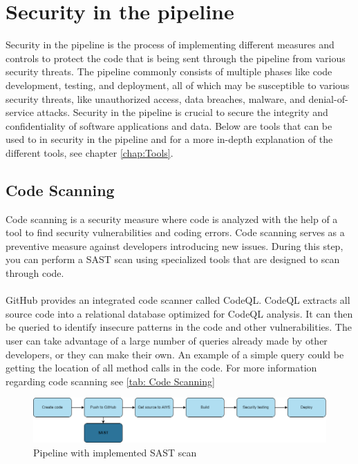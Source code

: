 \section{Security in the pipeline}
Security in the pipeline is the process of implementing different measures and controls to protect the code that is being sent through the pipeline from various security threats. The pipeline commonly consists of multiple phases like code development, testing, and deployment, all of which may be susceptible to various security threats, like unauthorized access, data breaches, malware, and denial-of-service attacks. Security in the pipeline is crucial to secure the integrity and confidentiality of software applications and data.
Below are tools that can be used to in security in the pipeline and for a more in-depth explanation of the different tools, see chapter \ref{chap:Tools}. 

\subsection{Code Scanning}
Code scanning is a security measure where code is analyzed with the help of a tool to find security vulnerabilities and coding errors. Code scanning serves as a preventive measure against developers introducing new issues. During this step, you can perform a SAST scan using specialized tools that are designed to scan through code. 
\\
\\
GitHub provides an integrated code scanner called CodeQL. CodeQL extracts all source code into a relational database optimized for CodeQL analysis.  It can then be queried to identify insecure patterns in the code and other vulnerabilities. The user can take advantage of a large number of queries already made by other developers, or they can make their own. An example of a simple query could be getting the location of all method calls in the code.  For more information regarding code scanning see \ref{tab: Code Scanning}
 \cite{codeql}

 \vspace{2mm}
\begin{figure}[H]
    \centering
    \includegraphics[width=0.8\columnwidth]{Images/pipeline2.png}
    \caption{Pipeline with implemented SAST scan}
    \label{fig: Pipeline with implemented SAST scan}
\end{figure}


